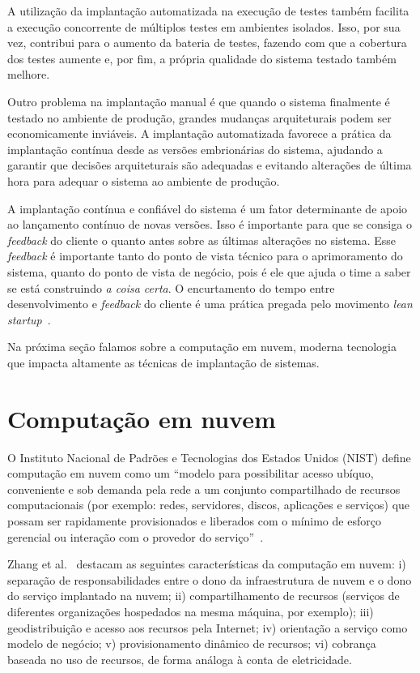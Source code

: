 A utilização da implantação automatizada na execução de testes também
facilita a execução concorrente de múltiplos testes em ambientes isolados.
Isso, por sua vez, contribui para o aumento da bateria de testes, fazendo com que
a cobertura dos testes aumente e, por fim, a própria qualidade do sistema testado também melhore.

Outro problema na implantação manual é que quando o sistema finalmente é testado
no ambiente de produção, grandes mudanças arquiteturais podem ser economicamente inviáveis.
A implantação automatizada favorece a prática da implantação contínua desde as versões
embrionárias do sistema, ajudando a garantir que decisões arquiteturais são adequadas
e evitando alterações de última hora para adequar o sistema ao ambiente de produção.

A implantação contínua e confiável do sistema é um fator determinante de apoio ao lançamento
contínuo de novas versões. Isso é importante para que se consiga o \emph{feedback} do cliente
o quanto antes sobre as últimas alterações no sistema.
Esse \emph{feedback} é importante tanto do ponto de vista técnico para o aprimoramento do sistema,
quanto do ponto de vista de negócio, pois é ele que ajuda o time a saber se está construindo
\emph{a coisa certa}.
O encurtamento do tempo entre desenvolvimento e \emph{feedback} do cliente
é uma prática pregada pelo movimento \emph{lean startup}~\cite{Ries2011Lean}.

Na próxima seção falamos sobre a computação em nuvem,
moderna tecnologia que impacta altamente as técnicas de implantação de sistemas.


\section{Computação em nuvem}
\label{sec:cloud}

O Instituto Nacional de Padrões e Tecnologias dos Estados Unidos (NIST) define computação em nuvem como um ``modelo para possibilitar acesso ubíquo, conveniente e sob demanda pela rede a um conjunto compartilhado de recursos computacionais (por exemplo: redes, servidores, discos, aplicações e serviços) que possam ser rapidamente provisionados e liberados com o mínimo de esforço gerencial ou interação com o provedor do serviço''~\cite{Nist2011Cloud}. 

Zhang et al.~\cite{Zhang2010Cloud} destacam as seguintes características da computação em nuvem: i) separação de responsabilidades entre o dono da infraestrutura de nuvem e o dono do serviço implantado na nuvem; ii) compartilhamento de recursos (serviços de diferentes organizações hospedados na mesma máquina, por exemplo); iii) geodistribuição e acesso aos recursos pela Internet; iv) orientação a serviço como modelo de negócio; v) provisionamento dinâmico de recursos; vi) cobrança baseada no uso de recursos, de forma análoga à conta de eletricidade.

